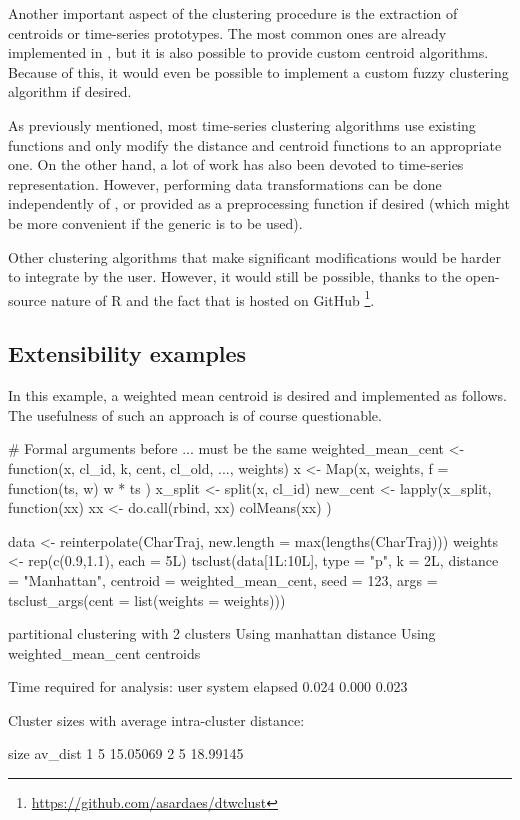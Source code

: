 Another important aspect of the clustering procedure is the extraction of centroids or time-series prototypes.
The most common ones are already implemented in \dtwclust{},
but it is also possible to provide custom centroid algorithms.
Because of this, it would even be possible to implement a custom fuzzy clustering algorithm if desired.

As previously mentioned,
most time-series clustering algorithms use existing functions and only modify the distance and centroid functions to an appropriate one.
On the other hand, a lot of work has also been devoted to time-series representation.
However, performing data transformations can be done independently of \dtwclust{},
or provided as a preprocessing function if desired
(which might be more convenient if the  generic is to be used).

Other clustering algorithms that make significant modifications would be harder to integrate by the user.
However, it would still be possible,
thanks to the open-source nature of R and the fact that \dtwclust{} is hosted on GitHub%
\footnote{\url{https://github.com/asardaes/dtwclust}}.

\subsection{Extensibility examples}

In this example,
a weighted mean centroid is desired and implemented as follows.
The usefulness of such an approach is of course questionable.

\begin{example}
# Formal arguments before ... must be the same
weighted_mean_cent <- function(x, cl_id, k, cent, cl_old, ..., weights) {
	x <- Map(x, weights, f = function(ts, w) { w * ts })
	x_split <- split(x, cl_id)
	new_cent <- lapply(x_split, function(xx) {
		xx <- do.call(rbind, xx)
		colMeans(xx)
	})
}

data <- reinterpolate(CharTraj, new.length = max(lengths(CharTraj)))
weights <- rep(c(0.9,1.1), each = 5L)
tsclust(data[1L:10L], type = "p", k = 2L,
        distance = "Manhattan",
        centroid = weighted_mean_cent,
        seed = 123,
        args = tsclust_args(cent = list(weights = weights)))

partitional clustering with 2 clusters
Using manhattan distance
Using weighted_mean_cent centroids

Time required for analysis:
user  system elapsed
0.024   0.000   0.023

Cluster sizes with average intra-cluster distance:

size  av_dist
1    5 15.05069
2    5 18.99145
\end{example}

